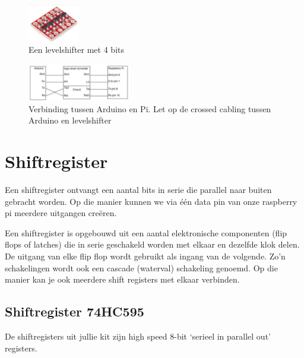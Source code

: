 \documentclass{article}
\begin{document}
\begin{figure}[H]
    \centering
    \includegraphics[width=0.2\textwidth]{levelshifter.png}
    \caption{Een levelshifter met 4 bits}
\end{figure}

\begin{figure}[H]
    \centering
    \includegraphics[width=0.4\textwidth]{levelshifter-arduino.png}
    \caption{Verbinding tussen Arduino en Pi. Let op de crossed cabling tussen Arduino en levelshifter}
\end{figure}

\section{Shiftregister}
Een shiftregister ontvangt een aantal bits in serie die parallel naar buiten gebracht worden. 
Op die manier kunnen we via één data pin van onze raspberry pi meerdere uitgangen creëren.

Een shiftregister is opgebouwd uit een aantal elektronische componenten (flip flops of latches) die in serie
geschakeld worden met elkaar en dezelfde klok delen. De uitgang van elke flip flop wordt gebruikt als ingang van de volgende. Zo’n schakelingen wordt ook een
cascade (waterval) schakeling genoemd. Op die manier kan je ook meerdere shift registers met elkaar
verbinden.

\subsection{Shiftregister 74HC595}
De shiftregisters uit jullie kit zijn high speed 8-bit `serieel in parallel out' registers.
\end{document}
